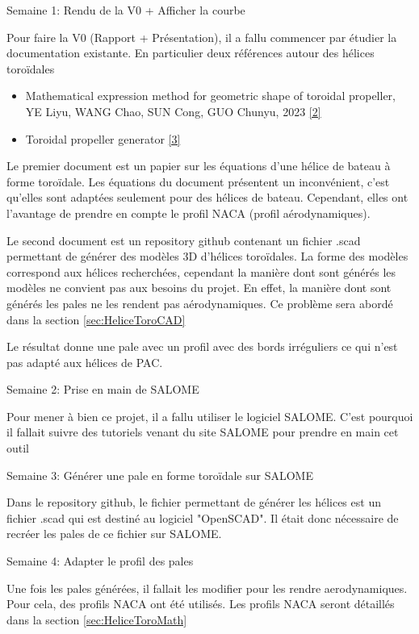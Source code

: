 \documentclass{article}
\begin{document}
Semaine 1: Rendu de la V0 + Afficher la courbe

Pour faire la V0 (Rapport + Présentation), il a fallu commencer par étudier la documentation existante. En particulier deux références autour des hélices toroïdales

\begin{itemize}
    \item Mathematical expression method for geometric shape of toroidal propeller, YE Liyu, WANG Chao, SUN Cong, GUO Chunyu, 2023 \href{http://www.ship-research.com/cn/article/doi/10.19693/j.issn.1673-3185.03419}{[2]}
    \item Toroidal propeller generator \href{https://github.com/RaulBejarano/Ultimate-Toroidal-Propeller-Generator}{[3]}
\end{itemize}

Le premier document est un papier sur les équations d'une hélice de bateau à forme toroïdale. Les équations du document présentent un inconvénient, c'est qu'elles sont adaptées seulement pour des hélices de bateau. Cependant, elles ont l'avantage de prendre en compte le profil NACA (profil aérodynamiques).

Le second document est un repository github contenant un fichier .scad permettant de générer des modèles 3D d'hélices toroïdales. 
La forme des modèles correspond aux hélices recherchées, cependant la manière dont sont générés les modèles ne convient pas aux besoins du projet.
En effet, la manière dont sont générés les pales ne les rendent pas aérodynamiques. Ce problème sera abordé dans la section \ref{sec:HeliceToroCAD}

Le résultat donne une pale avec un profil avec des bords irréguliers ce qui n'est pas adapté aux hélices de PAC.

Semaine 2: Prise en main de SALOME

Pour mener à bien ce projet, il a fallu utiliser le logiciel SALOME. C'est pourquoi il fallait suivre des tutoriels venant du site SALOME pour prendre en main cet outil

Semaine 3: Générer une pale en forme toroïdale sur SALOME

Dans le repository github, le fichier permettant de générer les hélices est un fichier .scad qui est destiné au logiciel "OpenSCAD". Il était donc nécessaire de recréer les pales de ce fichier sur SALOME.

Semaine 4: Adapter le profil des pales

Une fois les pales générées, il fallait les modifier pour les rendre aerodynamiques. Pour cela, des profils NACA ont été utilisés. Les profils NACA seront détaillés dans la section \ref{sec:HeliceToroMath}
\end{document}
